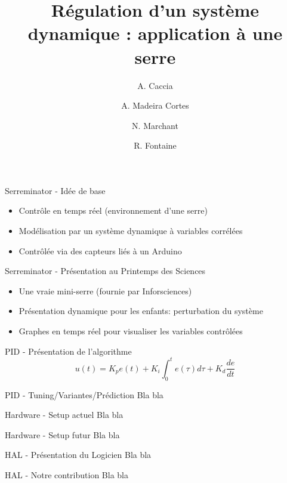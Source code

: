 \documentclass{beamer}
\title{Régulation d'un système dynamique : application à une serre}
\date{ }
\author{A. Caccia \and A. Madeira Cortes \and N. Marchant \and R. Fontaine}
\institute{Université Libre de Bruxelles}
\begin{document}
	\maketitle

		\begin{frame}{Serreminator - Idée de base}
			\begin{itemize}
        	\item Contrôle en temps réel (environnement d'une serre)
        	\item Modélisation par un système dynamique à variables corrélées
        	\item Contrôlée via des capteurs liés à un Arduino
      		\end{itemize}
		\end{frame}

		\begin{frame}{Serreminator - Présentation au Printemps des Sciences}
			\begin{itemize}
        	\item Une vraie mini-serre (fournie par Inforsciences)
        	\item Présentation dynamique pour les enfants: perturbation du système
        	\item Graphes en temps réel pour visualiser les variables contrôlées
      		\end{itemize}
		\end{frame}

		\begin{frame}{PID - Présentation de l'algorithme}
			$$u(t) = K_p e(t) + K_i \int_{0}^{t} e(\tau) d\tau + K_d \frac{de}{dt}$$
		\end{frame}

		\begin{frame}{PID - Tuning/Variantes/Prédiction}
			Bla bla
		\end{frame}

		\begin{frame}{Hardware - Setup actuel}
			Bla bla
		\end{frame}

		\begin{frame}{Hardware - Setup futur}
			Bla bla
		\end{frame}

		\begin{frame}{HAL - Présentation du Logicien}
			Bla bla
		\end{frame}

		\begin{frame}{HAL - Notre contribution}
			Bla bla
		\end{frame}
\end{document}
